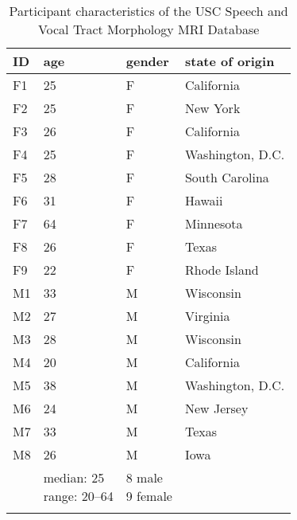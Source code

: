 \documentclass[reprint]{JASAnew}\usepackage[]{graphicx}\usepackage[]{color}
\newcommand\Tstrut{\rule{0pt}{2.6ex}}         %
\newcommand\Bstrut{\rule[-0.9ex]{0pt}{0pt}}   %
\begin{document}
\begin{longtable}{l l l l}
\hline
ID & age & gender & state of origin \Tstrut \Bstrut \\
\hline
F1	& 25 & F & California  \Tstrut \\ %
F2	& 25 & F & New York \\ %
F3	& 26 & F & 	California \\ %
F4	& 25 & F & 	Washington, D.C. \\ %
F5	& 28 & F & 	South Carolina \\ %
F6	& 31 & F & Hawaii \\ %
F7	& 64 & F & Minnesota \\ %
F8	& 26 & F & 	Texas \\ %
F9	& 22 & F & Rhode Island \\ %
M1 	& 33 & M & Wisconsin \\%
M2	& 27 & M & Virginia \\ %
M3	& 28 & M & Wisconsin \\ %
M4	& 20 & M & California \\ %
M5	& 38 & M & Washington, D.C. \\ %
M6	& 24 & M &	New Jersey \\ %
M7	& 33 & M & Texas \\ %
M8 	& 26 & M & Iowa \Bstrut \\ %
\hline
& \shortstack[l]{\Tstrut median: 25 \\ range: 20--64} 
& \shortstack[l]{\Tstrut 8 male \\ 9 female}
& \Tstrut \Bstrut \\
\hline 
\caption{Participant characteristics of the USC Speech and Vocal Tract Morphology MRI Database}
\label{tab:subj1}
\end{longtable}
\end{document}
